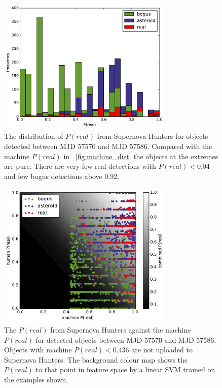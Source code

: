 \documentclass[a4paper,fleqn,usenatbib]{mnras}
\begin{document}
\begin{figure}
   \includegraphics[width=84mm]{figs/human_hist.pdf}
   \caption{The distribution of $P(real)$ from Supernova Hunters for objects detected between 
            MJD 57570 and MJD 57586.  Compared with the machine $P(real)$ in ~\ref{fig:machine_dist}
            the objects at the extremes are pure.  There are very few real detections with 
            $P(real) < 0.04$ and few bogus detections above 0.92.} 
   \label{fig:human_dist} 
\end{figure}

\begin{figure}
   \includegraphics[width=84mm]{figs/human_v_machine_train.pdf}
   \caption{The $P(real)$ from Supernova Hunters against the machine $P(real)$ for detected 
            objects between MJD 57570 and MJD 57586.  Objects with machine $P(real) < 0.436$ are
            not uploaded to Supernova Hunters.  The background colour map shows 
            the $P(real)$ to that point in feature space by a linear SVM trained on the 
            examples shown.}
   \label{fig:combo_train} 
\end{figure}
\end{document}
